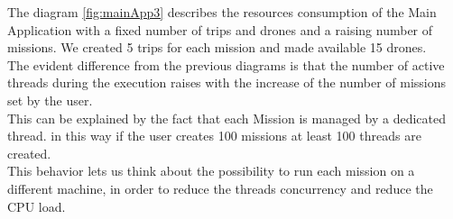 The diagram \ref{fig:mainApp3} describes the resources consumption of the Main Application with a fixed number of trips and drones and a raising number of missions. We created 5 trips for each mission and made available 15 drones.
\\
The evident difference from the previous diagrams is that the number of active threads during the execution raises with the increase of the number of missions set by the user. 
\\
This can be explained by the fact that each Mission is managed by a dedicated thread.
in this way if the user creates 100 missions at least 100 threads are created.
\\
This behavior lets us think about the possibility to run each mission on a different machine, in order to reduce the threads concurrency and reduce the CPU load.
\\
